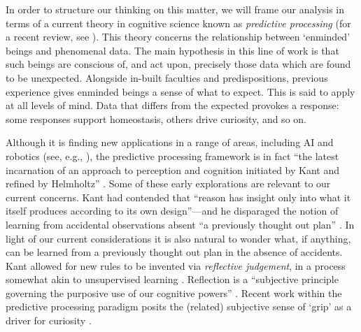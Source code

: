 In order to structure our thinking on this matter, we will frame our analysis in terms of a current theory in cognitive science known as \emph{predictive processing} (for a recent review, see \cite{newen2018oxford}).  This theory concerns the relationship between `enminded' beings \cite[pp.~170--171]{ingold2000perception} and phenomenal data.  The main hypothesis in this line of work is that such beings are conscious of, and act upon, precisely those data which are found to be unexpected.  Alongside in-built faculties and predispositions, previous experience gives enminded beings a sense of what to expect.    This is said to apply at all levels of mind.  Data that differs from the expected provokes a response: some responses support homeostasis, others drive curiosity, and so on.

Although it is finding new applications in a range of areas, including AI and robotics (see, e.g., \citet{DBLP:journals/corr/McGregorBB15,10.3389/frobt.2018.00021,thornton2017predictive}), the predictive processing framework is in fact ``the latest incarnation of an approach to perception and cognition initiated by Kant and refined by Helmholtz'' \cite{swanson2016predictive}.  Some of these early explorations are relevant to our current concerns.  Kant had contended that ``reason has insight only into what it itself produces according to its own design''---and he disparaged the notion of learning from accidental observations absent ``a previously thought out plan'' \cite[p.~20]{kant1929critique}.  In light of our current considerations it is also natural to wonder what, if anything, can be learned from a previously thought out plan in the absence of accidents.  Kant allowed for new rules to be invented via \emph{reflective judgement}, in a process somewhat akin to unsupervised learning \cite[p.~265]{kant1987critique}.  Reflection is a ``subjective principle governing the purposive use of our cognitive powers'' \cite[p.~266]{kant1987critique}.  Recent work within the predictive processing paradigm posits the (related) subjective sense of `grip' as a driver for curiosity \cite{Kiverstein2017}.

